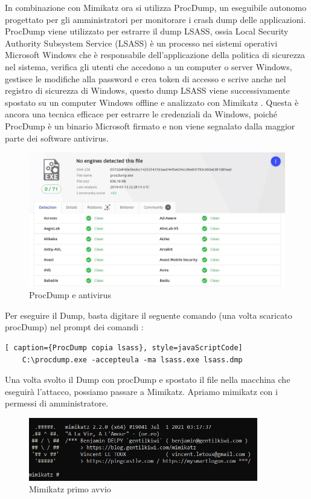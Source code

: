 In combinazione con Mimikatz ora si utilizza ProcDump\cite{ProcDump}, un eseguibile autonomo progettato per gli amministratori per monitorare i crash dump delle applicazioni. ProcDump viene utilizzato per estrarre il dump LSASS\cite{lsass}, ossia Local Security Authority Subsystem Service (LSASS) è un processo nei sistemi operativi Microsoft Windows che è responsabile dell'applicazione della politica di sicurezza nel sistema, verifica gli utenti che accedono a un computer o server Windows, gestisce le modifiche alla password e crea token di accesso e scrive anche nel registro di sicurezza di Windows, questo dump LSASS viene successivamente spostato su un computer Windows offline e analizzato con Mimikatz . Questa è ancora una tecnica efficace per estrarre le credenziali da Windows, poiché ProcDump è un binario Microsoft firmato e non viene segnalato dalla maggior parte dei software antivirus.

\begin{figure}[h!]
    \centering
    \includegraphics[width=120mm]{Immagini/2/procdump.jpg}
    \caption{ProcDump e antivirus}
    \label{fig:ProcDump}
\end{figure}

\newpage

Per eseguire il Dump, basta digitare il seguente comando (una volta scaricato procDump) nel prompt dei comandi :

\begin{lstlisting}[ caption={ProcDump copia lsass}, style=javaScriptCode]
    C:\procdump.exe -accepteula -ma lsass.exe lsass.dmp
\end{lstlisting}

Una volta svolto il Dump con procDump e spostato il file nella macchina che eseguirà l'attacco, possiamo passare a Mimikatz. 
Apriamo mimikatz con i permessi di amministratore.
\begin{figure}[h!]
    \centering
    \includegraphics[width=100mm]{Immagini/2/mimikatz_1.PNG}
    \caption{Mimikatz primo avvio}
    \label{fig:ProcDump}
\end{figure}

